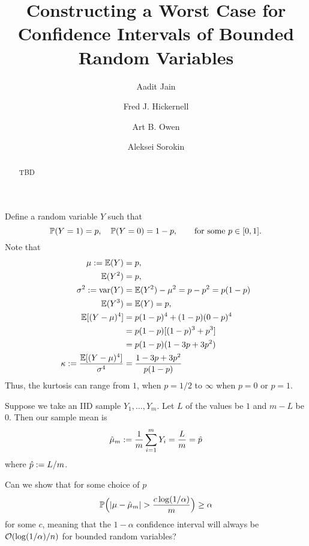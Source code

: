 \documentclass{amsart}
\begin{document}
\title{Constructing a Worst Case for Confidence Intervals of Bounded Random Variables}

\author{Aadit Jain}

\author{Fred J. Hickernell }
\address{Department of Applied Mathematics, Illinois Institute of Technology, Chicago, IL}

\author{Art B. Owen}

\author{Aleksei Sorokin}

\begin{abstract} TBD
\end{abstract}

\maketitle

Define a random variable $Y$ such that 
\begin{equation*}
    \operatorname{\mathbb{P}}(Y = 1) = p, \quad \operatorname{\mathbb{P}}(Y=0) = 1-p, \qquad \text{for some } p \in [0,1].
\end{equation*}
Note that 
\begin{align*}
    \mu : = \operatorname{\mathbb{E}}(Y) & = p, \\
    \operatorname{\mathbb{E}}(Y^2) & = p, \\
    \sigma^2 : = \operatorname{var}(Y) & = \operatorname{\mathbb{E}}(Y^2) - \mu^2 = p - p^2 = p(1-p)\\
    \operatorname{\mathbb{E}}(Y^3) & = \operatorname{\mathbb{E}}(Y) =  p, \\
    \operatorname{\mathbb{E}}[(Y - \mu)^4] & = p(1-p)^4 + (1-p)(0 - p)^4 \\
    & = p(1 - p)[(1-p)^3 + p^3] \\
    & = p(1-p)(1 - 3p + 3 p^2) \\
    \kappa : = \frac{\operatorname{\mathbb{E}}[(Y - \mu)^4]}{\sigma^4} & = 
    \frac{1 - 3p + 3 p^2}{p(1-p)}
\end{align*}
Thus, the kurtosis can range from $1$, when $p = 1/2$ to $\infty$ when $p = 0$ or $p=1$.


Suppose we take an IID sample $Y_1, \ldots, Y_m$.  Let $L$ of the values be $1$ and $m - L$ be $0$.  Then our sample mean is 
\begin{equation*}
    \hat{\mu}_m := \frac 1m \sum_{i=1}^m Y_i 
    = \frac{L}{m} =  \hat{p}
\end{equation*}
where $\hat{p} : = L/m$.

Can we show that for some choice of $p$
\[
\operatorname{\mathbb{P}}\Bigl(\lvert \mu - \hat{\mu}_m \rvert > \frac{c \log(1/\alpha)}{m} \Bigr) \ge \alpha
\]
for some $c$, meaning that the $1-\alpha$ confidence interval will always be $\operatorname{{\mathcal O}}(\log(1/\alpha)/n)$ for bounded random variables?
\end{document}
